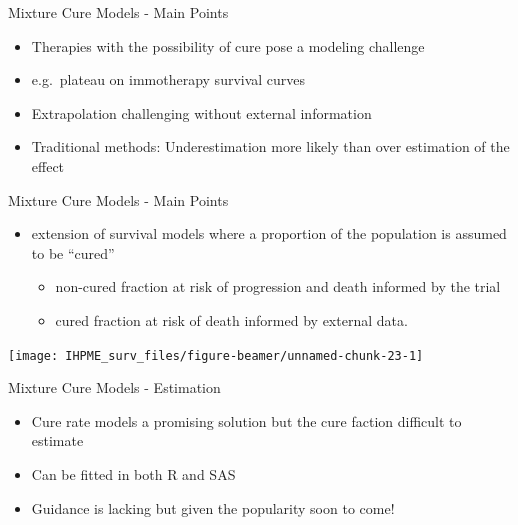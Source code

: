 \documentclass[
  ignorenonframetext,
]{beamer}
\providecommand{\tightlist}{%
  \setlength{\itemsep}{0pt}\setlength{\parskip}{0pt}}
\begin{document}
\begin{frame}{Mixture Cure Models - Main Points}
\protect\hypertarget{mixture-cure-models---main-points}{}

\begin{itemize}
\tightlist
\item
  Therapies with the possibility of cure pose a modeling challenge
\item
  e.g.~plateau on immotherapy survival curves
\item
  Extrapolation challenging without external information
\item
  Traditional methods: Underestimation more likely than over estimation
  of the effect
\end{itemize}

\end{frame}

\begin{frame}{Mixture Cure Models - Main Points}
\protect\hypertarget{mixture-cure-models---main-points-1}{}

\begin{itemize}
\tightlist
\item
  extension of survival models where a proportion of the population is
  assumed to be ``cured''

  \begin{itemize}
  \tightlist
  \item
    non-cured fraction at risk of progression and death informed by the
    trial
  \item
    cured fraction at risk of death informed by external data.
  \end{itemize}
\end{itemize}

\texttt{[image: IHPME\_surv\_files/figure-beamer/unnamed-chunk-23-1]}

\end{frame}

\begin{frame}{Mixture Cure Models - Estimation}
\protect\hypertarget{mixture-cure-models---estimation}{}

\begin{itemize}
\item
  Cure rate models a promising solution but the cure faction difficult
  to estimate
\item
  Can be fitted in both R and SAS
\item
  Guidance is lacking but given the popularity soon to come!
\end{itemize}

\end{frame}
\end{document}
